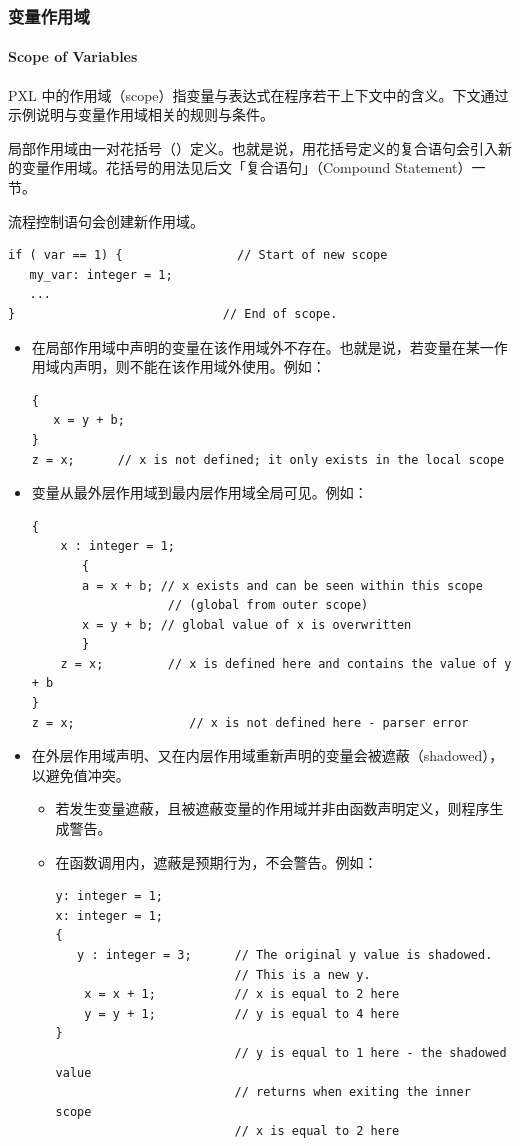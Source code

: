 \subsubsection{变量作用域}
\paragraph*{Scope of Variables}

PXL 中的作用域（scope）指变量与表达式在程序若干上下文中的含义。下文通过示例说明与变量作用域相关的规则与条件。

局部作用域由一对花括号（\cmd{\{\}}）定义。也就是说，用花括号定义的复合语句会引入新的变量作用域。花括号的用法见后文「复合语句」（Compound Statement）一节。

流程控制语句会创建新作用域。
\begin{lstlisting}[style=pxl]
if ( var == 1) {                // Start of new scope
   my_var: integer = 1;
   ...
}                             // End of scope.
\end{lstlisting}

\begin{itemize}
  \item 在局部作用域中声明的变量在该作用域外不存在。也就是说，若变量在某一作用域内声明，则不能在该作用域外使用。例如：
\begin{lstlisting}[style=pxl]
{
   x = y + b;
}
z = x;      // x is not defined; it only exists in the local scope
\end{lstlisting}
  \item 变量从最外层作用域到最内层作用域全局可见。例如：
\begin{lstlisting}[style=pxl]
{
    x : integer = 1;
       {
       a = x + b; // x exists and can be seen within this scope
                   // (global from outer scope)
       x = y + b; // global value of x is overwritten
       }
    z = x;         // x is defined here and contains the value of y + b
}
z = x;                // x is not defined here - parser error
\end{lstlisting}
  \item 在外层作用域声明、又在内层作用域重新声明的变量会被遮蔽（shadowed），以避免值冲突。
  \begin{itemize}
    \item 若发生变量遮蔽，且被遮蔽变量的作用域并非由函数声明定义，则程序生成警告。
    \item 在函数调用内，遮蔽是预期行为，不会警告。例如：
\begin{lstlisting}[style=pxl]
y: integer = 1;
x: integer = 1;
{
   y : integer = 3;      // The original y value is shadowed.
                         // This is a new y.
    x = x + 1;           // x is equal to 2 here
    y = y + 1;           // y is equal to 4 here
}
                         // y is equal to 1 here - the shadowed value
                         // returns when exiting the inner scope
                         // x is equal to 2 here
\end{lstlisting}
  \end{itemize}
\end{itemize}

